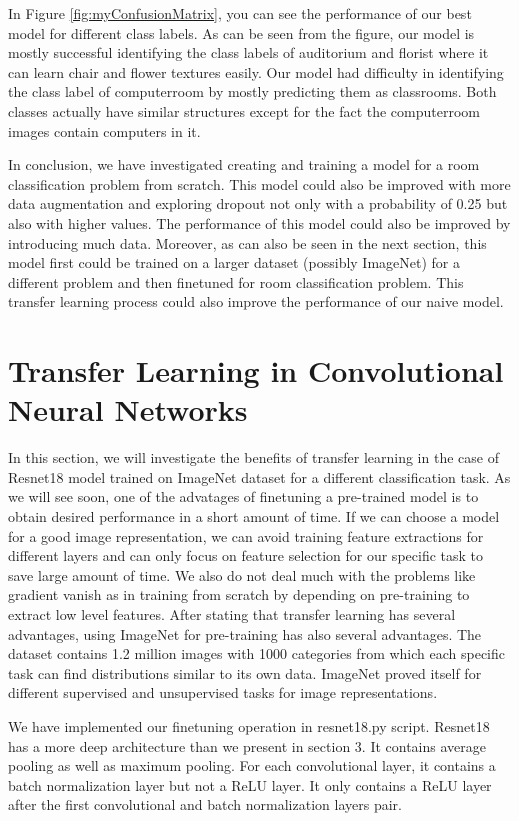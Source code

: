 \documentclass{article}
\begin{document}
In Figure \ref{fig:myConfusionMatrix}, you can see the performance of our best model for different class labels. As can be seen from the figure, our model is mostly successful identifying the class labels of auditorium and florist where it can learn chair and flower textures easily. Our model had difficulty in identifying the class label of computerroom by mostly predicting them as classrooms. Both classes actually have similar structures except for the fact the computerroom images contain computers in it.

In conclusion, we have investigated creating and training a model for a room classification problem from scratch. This model could also be improved with more data augmentation and exploring dropout not only with a probability of 0.25 but also with higher values. The performance of this model could also be improved by introducing much data. Moreover, as can also be seen in the next section, this model first could be trained on a larger dataset (possibly ImageNet) for a different problem and then finetuned for room classification problem. This transfer learning process could also improve the performance of our naive model.

\section{Transfer Learning in Convolutional Neural Networks}

In this section, we will investigate the benefits of transfer learning in the case of Resnet18 model trained on ImageNet dataset for a different classification task. As we will see soon, one of the advatages of finetuning a pre-trained model is to obtain desired performance in a short amount of time. If we can choose a model for a good image representation, we can avoid training feature extractions for different layers and can only focus on feature selection for our specific task to save large amount of time. We also do not deal much with the problems like gradient vanish as in training from scratch by depending on pre-training to extract low level features. After stating that transfer learning has several advantages, using ImageNet for pre-training has also several advantages. The dataset contains 1.2 million images with 1000 categories from which each specific task can find distributions similar to its own data. ImageNet proved itself for different supervised and unsupervised tasks for image representations.

We have implemented our finetuning operation in resnet18.py script. Resnet18 has a more deep architecture than we present in section 3. It contains average pooling as well as maximum pooling. For each convolutional layer, it contains a batch normalization layer but not a ReLU layer. It only contains a ReLU layer after the first convolutional and batch normalization layers pair.
\end{document}

